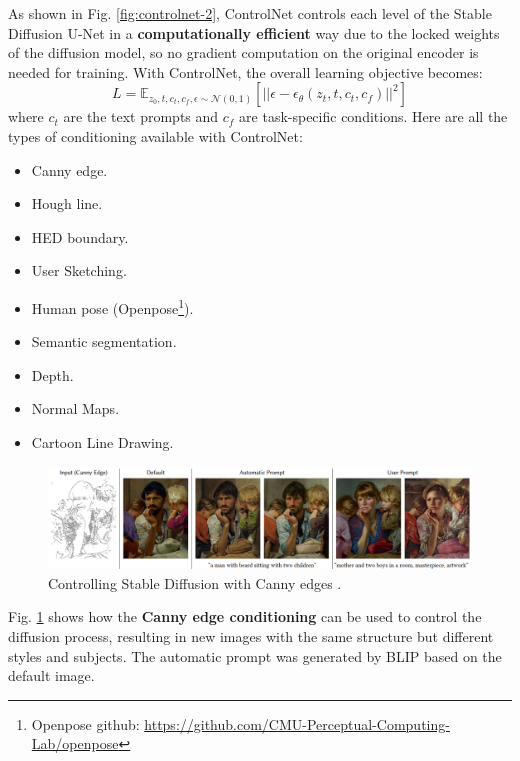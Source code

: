 \documentclass[preprint]{elsarticle}
\begin{document}
As shown in Fig. \ref{fig:controlnet-2}, ControlNet controls each level of the Stable Diffusion U-Net in a 
\textbf{computationally efficient} way due to the locked weights of the diffusion model, so no gradient computation on the original 
encoder is needed for training. With ControlNet, the overall learning objective becomes:
\begin{equation}
	L = \mathbb{E}_{z_0,t,c_t,c_f,\epsilon \sim \mathcal{N}(0,1)}\left[||\epsilon-\epsilon_\theta(z_t,t,c_t,c_f)||^2 \right]
\end{equation}
where $c_t$ are the text prompts and $c_f$ are task-specific conditions.
Here are all the types of conditioning available with ControlNet:
\begin{itemize}
	\item Canny edge.
	\item Hough line.
	\item HED boundary.
	\item User Sketching.
	\item Human pose (Openpose\footnote{Openpose github: \url{https://github.com/CMU-Perceptual-Computing-Lab/openpose}}).
	\item Semantic segmentation.
	\item Depth.
	\item Normal Maps.
	\item Cartoon Line Drawing.
\end{itemize}

\begin{figure}[H]
	\centering
	\includegraphics[width=15cm, keepaspectratio]{img/background_img/canny.png}
	\caption{Controlling Stable Diffusion with Canny edges \cite{zhang2023adding}.}
	\label{fig:canny}
\end{figure}

Fig. \ref{fig:canny} shows how the \textbf{Canny edge conditioning} can be used to control the diffusion process,
resulting in new images with the same structure but different styles and subjects.
The automatic prompt was generated by BLIP based on the default image.
\end{document}
